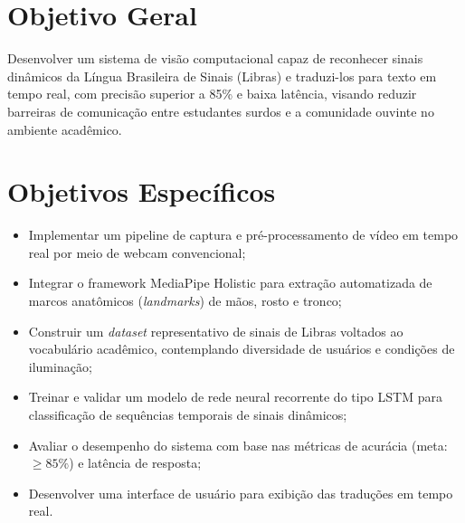 
\section{Objetivo Geral}

Desenvolver um sistema de visão computacional capaz de reconhecer sinais dinâmicos da Língua Brasileira de Sinais (Libras) e traduzi-los para texto em tempo real, com precisão superior a 85\% e baixa latência, visando reduzir barreiras de comunicação entre estudantes surdos e a comunidade ouvinte no ambiente acadêmico.

\section{Objetivos Específicos}

\begin{itemize}
    \item Implementar um pipeline de captura e pré-processamento de vídeo em tempo real por meio de webcam convencional;
    \item Integrar o framework MediaPipe Holistic para extração automatizada de marcos anatômicos (\textit{landmarks}) de mãos, rosto e tronco;
    \item Construir um \textit{dataset} representativo de sinais de Libras voltados ao vocabulário acadêmico, contemplando diversidade de usuários e condições de iluminação;
    \item Treinar e validar um modelo de rede neural recorrente do tipo LSTM para classificação de sequências temporais de sinais dinâmicos;
    \item Avaliar o desempenho do sistema com base nas métricas de acurácia (meta: $\geq 85\%$) e latência de resposta;
    \item Desenvolver uma interface de usuário para exibição das traduções em tempo real.
\end{itemize}
